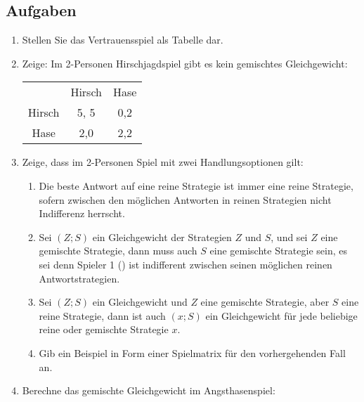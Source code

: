 \subsection{Aufgaben}

\begin{enumerate}
  \item Stellen Sie das Vertrauensspiel als Tabelle dar.
  
  \item Zeige: Im 2-Personen Hirschjagdspiel gibt es kein gemischtes
  Gleichgewicht:

\begin{center}
\begin{tabular}{c|c|c|}
\multicolumn{1}{c}{} & \multicolumn{1}{c}{Hirsch} & \multicolumn{1}{c}{Hase} 
\\ \cline{2-3} 
Hirsch               & 5, 5                    & 0,2  \\ \cline{2-3}
Hase                 & 2,0                     & 2,2 \\ \cline{2-3}
\end{tabular}
\end{center}
  
  \item Zeige, dass im 2-Personen Spiel mit zwei Handlungsoptionen gilt:
  \label{gemischteStrategienAufgabe}
  \begin{enumerate} 
    \item Die beste
    Antwort auf eine reine Strategie ist immer eine reine Strategie, sofern
    zwischen den möglichen Antworten in reinen Strategien nicht Indifferenz herrscht.
    \item Sei $(Z; S)$ ein Gleichgewicht der Strategien $Z$ und $S$, und sei
    $Z$ eine gemischte Strategie, dann muss auch $S$ eine gemischte Strategie sein, es sei denn
    Spieler 1 () ist indifferent zwischen seinen möglichen reinen
    Antwortstrategien.
    \item Sei $(Z; S)$ ein Gleichgewicht und $Z$ eine gemischte Strategie, aber
     $S$ eine reine Strategie, dann ist auch $(x; S)$ ein Gleichgewicht für
     jede beliebige reine oder gemischte Strategie $x$.
    \item Gib ein Beispiel in Form einer Spielmatrix für den vorhergehenden
    Fall an.
  \end{enumerate}

  \item \label{chickenGameAufgabe} Berechne das gemischte Gleichgewicht im
  Angsthasenspiel:
  

\end{enumerate}
